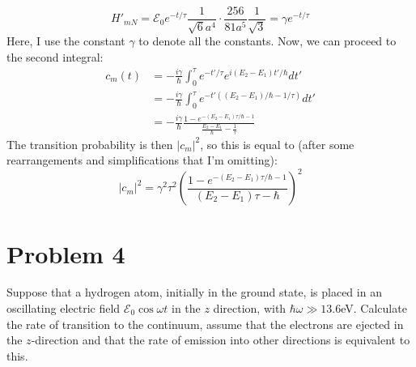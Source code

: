 \documentclass[10pt]{article}
\begin{document}
\begin{solution}
\[			H'_{mN} = \mathcal E_0 e^{-t/\tau} \frac{1}{\sqrt{6} a^4} \cdot \frac{256}{81a^5} 
			\frac{1}{\sqrt{3} } = \gamma e^{-t/\tau}
		\]
		Here, I use the constant $\gamma$ to denote all the constants. Now, we can proceed to the second
		integral: 
		\begin{align*}
			c_m(t) &= -\frac{i\gamma}{\hbar}\int_0^\tau  e^{-t'/\tau} e^{i(E_2 - E_1)t'/\hbar} dt'\\
				   &= -\frac{i\gamma}{\hbar} \int_0^\tau e^{-t'((E_2 - E_1)/\hbar - 1/\tau)} dt'\\
				   &= -\frac{i\gamma}{\hbar} \frac{1 - e^{-(E_2 - E_1)\tau/\hbar - 1}}{\frac{E_2 - E_1}{\hbar} -
				   \frac{1}{\tau}}
		\end{align*}
		The transition probability is then $|c_m|^2$, so this is equal to (after some rearrangements and 
		simplifications that I'm omitting):
		\[
			|c_m|^2= \gamma^2 \tau^2 \left( \frac{1 - e^{-(E_2 - E_1)\tau/\hbar - 1}}{(E_2 - E_1)\tau - 
			\hbar} \right)^2
		\] 
	\end{solution}

	\pagebreak
	\section*{Problem 4}
	Suppose that a hydrogen atom, initially in the ground state, is placed in an oscillating electric field
	$\mathcal E_0 \cos \omega t$ in the $z$ direction, with $\hbar \omega \gg 13.6$eV. Calculate the rate of 
	transition to the continuum, assume that the electrons are ejected in the $z$-direction and that the rate of
	emission into other directions is equivalent to this. 
\end{document}
